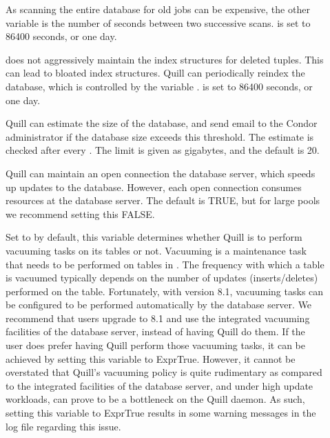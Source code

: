 \begin{description}
\item[]
As scanning the entire database for old jobs can be expensive,
the other variable 
is the number of seconds between two successive scans.  
 is set to 86400 seconds, or one day.

\item[]
 does not aggressively maintain the index structures for
deleted tuples. This can lead to bloated index structures.
Quill can periodically reindex the database, which is controlled by the
variable .
 is set to 86400 seconds, or one day.

\item[]
Quill can estimate the size of the database, and send email to the Condor
administrator if the database size exceeds this threshold. 
The estimate is checked after every .
The limit is given as gigabytes, and the default is 20.

\item[]
Quill can maintain an open connection the database server, which speeds up
updates to the database. 
However, each open connection consumes resources at the database server.
The default is TRUE, but for large pools we recommend setting this 
FALSE.

\item[]
Set to  by default, this variable determines whether Quill is to 
perform vacuuming tasks on its tables or not. Vacuuming is a maintenance 
task that needs to be performed on tables in . The 
frequency with which a table is vacuumed typically depends on the number 
of updates (inserts/deletes) performed on the table. Fortunately, with 
 version 8.1, vacuuming tasks can be configured to be 
performed automatically by the database server. We recommend that users 
upgrade to 8.1 and use the integrated vacuuming facilities of the database 
server, instead of having Quill do them. If the user does prefer having 
Quill perform those vacuuming tasks, it can be achieved by setting this 
variable to Expr{True}. However, it cannot be overstated that Quill's vacuuming 
policy is quite rudimentary as compared to the integrated facilities 
of the database server, and under high update workloads, can prove to 
be a bottleneck on the Quill daemon. As such, setting this variable to 
Expr{True} results in some warning messages in the log file regarding this 
issue.


\end{description}
